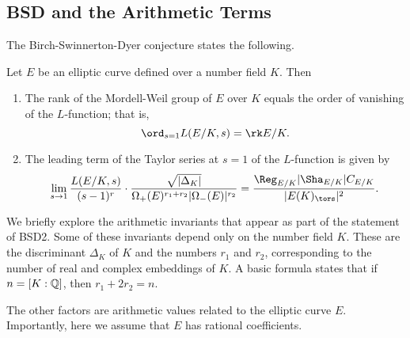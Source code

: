 \subsection{BSD and the Arithmetic Terms}

The Birch-Swinnerton-Dyer conjecture states the following.

\begin{conj}[BSD]
    Let $E$ be an elliptic curve defined over a number field $K$. Then 
    \begin{enumerate}[label={\bfseries  BSD\arabic*.}]
        \item The rank of the Mordell-Weil group of $E$ over $K$ equals the order of vanishing of the $L$-function; that is,
        $$\ord_{s=1}L(E/K,s)=\rk E/K.$$
        \item The leading term of the Taylor series at $s=1$ of the $L$-function is given by 
        \begin{equation}\label{BSD_2}
            \lim_{s\to1}\frac{L(E/K,s)}{(s-1)^r}\cdot\frac{\sqrt{|\Delta_K|}}{\Omega_+(E)^{r_1+r_2}|\Omega_-(E)|^{r_2}}=\frac{\Reg_{E/K}|\Sha_{E/K}|C_{E/K}}{|E(K)_{\tors}|^2}.
        \end{equation}
    \end{enumerate}
\end{conj}

We briefly explore the arithmetic invariants that appear as part of the statement of BSD2. Some of these invariants depend only on the number field $K$. These are the discriminant $\Delta_K$ of $K$ and the numbers $r_1$ and $r_2$, corresponding to the number of real and complex embeddings of $K$. A basic formula states that if $n=[K:\mathbb{Q}]$, then $r_1+2r_2=n$. 

The other factors are arithmetic values related to the elliptic curve $E$. Importantly, here we assume that $E$ has rational coefficients.

